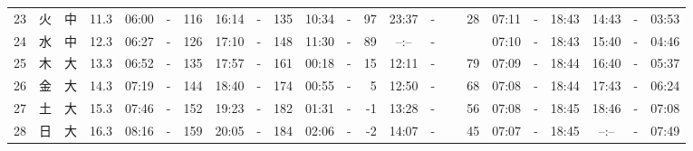 \documentclass[12pt,a4j]{jsarticle}
\begin{document}
\begin{table}[htbp]
\begin{center}
{\begin{tabular}{|rc|cr|ccrccr|ccrccr|ccc|ccc|}
23 & 火 & 中 & 11.3 &  06:00 &-& 116 &  16:14 &-& 135 &  10:34 &-&  97 &  23:37 &-&  28 & 07:11 & -& 18:43 & 14:43 & -& 03:53 \\
24 & 水 & 中 & 12.3 &  06:27 &-& 126 &  17:10 &-& 148 &  11:30 &-&  89 &  --:-- &-&~~~~~ & 07:10 & -& 18:43 & 15:40 & -& 04:46 \\
25 & 木 & 大 & 13.3 &  06:52 &-& 135 &  17:57 &-& 161 &  00:18 &-&  15 &  12:11 &-&  79 & 07:09 & -& 18:44 & 16:40 & -& 05:37 \\
26 & 金 & 大 & 14.3 &  07:19 &-& 144 &  18:40 &-& 174 &  00:55 &-&   5 &  12:50 &-&  68 & 07:08 & -& 18:44 & 17:43 & -& 06:24 \\
27 & 土 & 大 & 15.3 &  07:46 &-& 152 &  19:23 &-& 182 &  01:31 &-&  -1 &  13:28 &-&  56 & 07:08 & -& 18:45 & 18:46 & -& 07:08 \\
28 & 日 & 大 & 16.3 &  08:16 &-& 159 &  20:05 &-& 184 &  02:06 &-&  -2 &  14:07 &-&  45 & 07:07 & -& 18:45 & --:-- & -& 07:49 \\
   \hline
   \end{tabular}}
   \end{center}
\end{table}
\newpage
\end{document}
